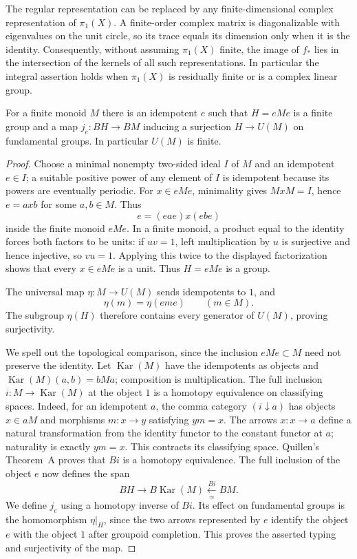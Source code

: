 \begin{remark}
\label{CP2:C-linear-extension}
The regular representation can be replaced by any finite-dimensional
complex representation of $\pi_1(X)$.  A finite-order complex matrix
is diagonalizable with eigenvalues on the unit circle, so its trace
equals its dimension only when it is the identity.  Consequently,
without assuming $\pi_1(X)$ finite, the image of $f_*$ lies in the
intersection of the kernels of all such representations.  In
particular the integral assertion holds when $\pi_1(X)$ is
residually finite or is a complex linear group.
\end{remark}

\begin{lemma}
\label{CP2:C-minimal-corner}
For a finite monoid $M$ there is an idempotent $e$ such that $H=eMe$
is a finite group and a map $j_e:BH\to BM$ inducing a surjection
$H\to U(M)$ on fundamental groups.  In particular $U(M)$ is finite.
\end{lemma}
\begin{proof}
Choose a minimal nonempty two-sided ideal $I$ of $M$ and an idempotent
$e\in I$; a suitable positive power of any element of $I$ is
idempotent because its powers are eventually periodic.  For
$x\in eMe$, minimality gives $MxM=I$, hence
$e=axb$ for some $a,b\in M$.  Thus
\[
 e=(eae)x(ebe)
\]
inside the finite monoid $eMe$.  In a finite monoid, a product equal
to the identity forces both factors to be units: if $uv=1$, left
multiplication by $u$ is surjective and hence injective, so
$vu=1$.  Applying this twice to the displayed factorization shows
that every $x\in eMe$ is a unit.  Thus $H=eMe$ is a group.

The universal map $\eta:M\to U(M)$ sends idempotents to $1$, and
\[
 \eta(m)=\eta(eme) \qquad(m\in M).
\]
The subgroup $\eta(H)$ therefore contains every generator of
$U(M)$, proving surjectivity.

We spell out the topological comparison, since the inclusion
$eMe\subset M$ need not preserve the identity.  Let
$\operatorname{Kar}(M)$ have the idempotents as objects and
$\operatorname{Kar}(M)(a,b)=bMa$; composition is multiplication.
The full inclusion $i:M\to\operatorname{Kar}(M)$ at the object $1$
is a homotopy equivalence on classifying spaces.  Indeed, for an
idempotent $a$, the comma category $(i\downarrow a)$ has objects
$x\in aM$ and morphisms $m:x\to y$ satisfying $ym=x$.
The arrows $x:x\to a$ define a natural transformation from the
identity functor to the constant functor at $a$; naturality is
exactly $ym=x$.  This contracts its classifying space.  Quillen's
Theorem~A proves that $Bi$ is a homotopy equivalence.
The full inclusion of the object $e$ now defines the span
\[
 BH\longrightarrow B\operatorname{Kar}(M)
       \xleftarrow[\simeq]{Bi} BM.
\]
We define $j_e$ using a homotopy inverse of $Bi$.  Its effect on
fundamental groups is the homomorphism $\eta|_H$, since the two
arrows represented by $e$ identify the object $e$ with the object
$1$ after groupoid completion.  This proves the asserted typing and
surjectivity of the map.
\end{proof}

